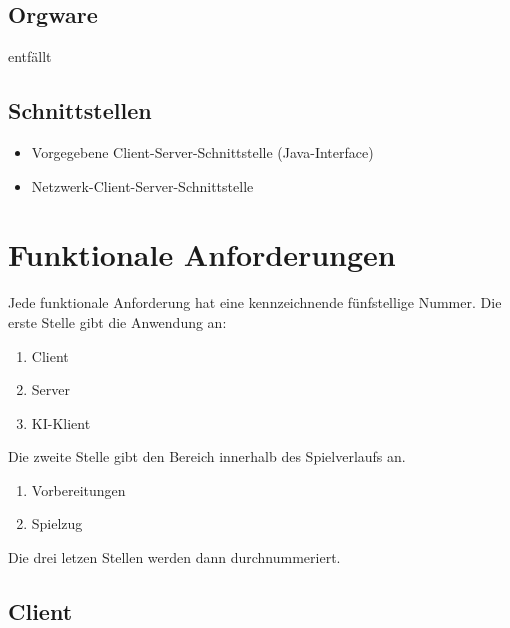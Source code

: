 \documentclass[a4paper,10pt]{article}
\begin{document}
\subsection{Orgware}
entfällt
\subsection{Schnittstellen}
\begin{itemize}
\item Vorgegebene Client-Server-Schnittstelle (Java-Interface)
\item Netzwerk-Client-Server-Schnittstelle
\end{itemize}
\section{Funktionale Anforderungen}
Jede funktionale Anforderung hat eine kennzeichnende fünfstellige Nummer. Die erste Stelle gibt die Anwendung an:
\begin{enumerate}
\item Client
\item Server
\item KI-Klient
\end{enumerate}
Die zweite Stelle gibt den Bereich innerhalb des Spielverlaufs an.
\begin{enumerate}
\item Vorbereitungen
\item Spielzug
\end{enumerate}
Die drei letzen Stellen werden dann durchnummeriert.
\subsection{Client}
\end{document}
